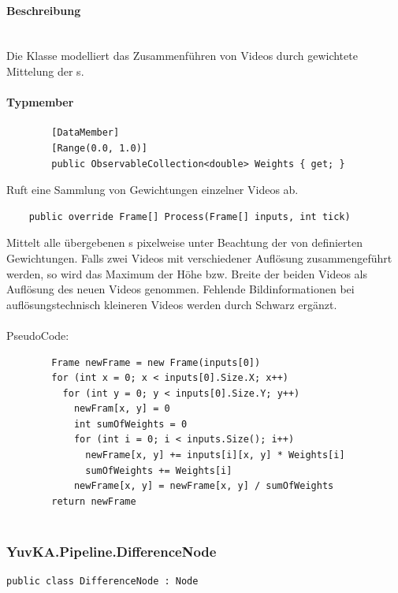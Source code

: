 \paragraph{Beschreibung}~\\
Die Klasse  modelliert das Zusammenführen von Videos durch gewichtete Mittelung der s.

\paragraph{Typmember}
\begin{itemize}

	\begin{verbatim}
		[DataMember]
		[Range(0.0, 1.0)]
		public ObservableCollection<double> Weights { get; }
	\end{verbatim}
	Ruft eine Sammlung von Gewichtungen einzelner Videos ab.

	\begin{verbatim}
	public override Frame[] Process(Frame[] inputs, int tick)
	\end{verbatim}
	Mittelt alle übergebenen s pixelweise unter Beachtung der von  definierten Gewichtungen. Falls zwei Videos mit verschiedener Auflösung zusammengeführt werden, so wird das Maximum der Höhe bzw. Breite der beiden Videos als Auflösung des neuen Videos genommen. Fehlende Bildinformationen bei auflösungstechnisch kleineren Videos werden durch Schwarz ergänzt.\\~\\
	PseudoCode:
	\begin{verbatim}
		Frame newFrame = new Frame(inputs[0])
		for (int x = 0; x < inputs[0].Size.X; x++)
		  for (int y = 0; y < inputs[0].Size.Y; y++)
		    newFram[x, y] = 0
		    int sumOfWeights = 0
		    for (int i = 0; i < inputs.Size(); i++)
		      newFrame[x, y] += inputs[i][x, y] * Weights[i]
		      sumOfWeights += Weights[i]
		    newFrame[x, y] = newFrame[x, y] / sumOfWeights
		return newFrame
		
	\end{verbatim}
	
\end{itemize}

\subsubsection{YuvKA.Pipeline.DifferenceNode}

\begin{verbatim}
public class DifferenceNode : Node
\end{verbatim}

